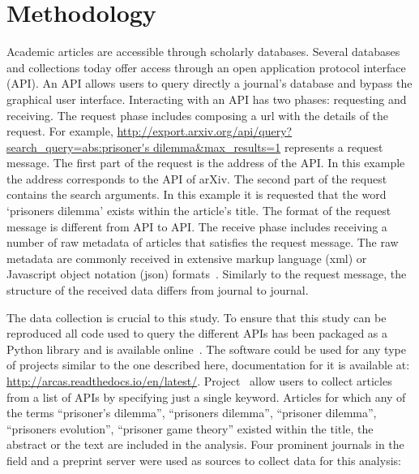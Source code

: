 \section{Methodology}\label{section:methodology}

Academic articles are accessible through scholarly databases. Several databases
and collections today offer access through an open application protocol
interface (API). An API allows users to query directly a journal's database and
bypass the graphical user interface. Interacting with an API has two phases:
requesting and receiving. The request phase includes composing a url with the
details of the request. For example,
\url{http://export.arxiv.org/api/query?search_query=abs:prisoner's
dilemma&max_results=1} represents a request message. The first part of the
request is the address of the API. In this example the address corresponds to
the API of arXiv. The second part of the request contains the search arguments.
In this example it is requested that the word `prisoners dilemma' exists within
the article's title. The format of the request message is different from API to
API. The receive phase includes receiving a number of raw metadata of articles
that satisfies the request message. The raw metadata are commonly received in
extensive markup language (xml) or Javascript object notation (json)
formats~\cite{nurseitov2009}. Similarly to the request message, the structure of
the received data differs from journal
to journal.

The data collection is crucial to this study. To ensure that this study can be
reproduced all code used to query the different APIs has been packaged as a
Python library and is available online~\cite{nikoleta_2017}. The software could
be used for any type of projects similar to the one described here,
documentation for it is available at:
\url{http://arcas.readthedocs.io/en/latest/}. Project~\cite{nikoleta_2017} allow
users to collect articles from a list of APIs by specifying just a single
keyword. Articles for which any of the terms ``prisoner's dilemma'',
``prisoners dilemma'', ``prisoner dilemma'', ``prisoners evolution'', ``prisoner
game theory'' existed within the title, the abstract or the text are included
in the analysis. Four prominent journals in the field and a preprint server
were used as sources to collect data for this analysis:

